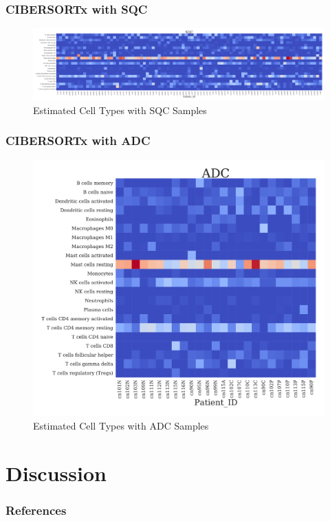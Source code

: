 \documentclass{beamer}
\begin{document}
    \begin{frame}
        \frametitle{CIBERSORTx with SQC}

        \begin{figure}
            \includegraphics[width=\linewidth]{figures/CIBERSORTx/SQC.Bowtie2.CibersortX.pdf}
            \caption{Estimated Cell Types with SQC Samples}
        \end{figure}
    \end{frame}

    \begin{frame}
        \frametitle{CIBERSORTx with ADC}

        \begin{figure}
            \includegraphics[width=0.6 \linewidth]{figures/CIBERSORTx/ADC.Bowtie2.CibersortX.pdf}
            \caption{Estimated Cell Types with ADC Samples}
        \end{figure}
    \end{frame}

    \section{Discussion}

    \begin{frame}[allowframebreaks]
        \frametitle{References}
        
        
    \end{frame}
\end{document}
